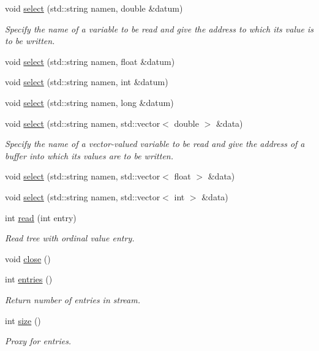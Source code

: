 \begin{CompactItemize}
\item 
void \hyperlink{classitreestream_a11}{select} (std::string namen, double \&datum)
\begin{CompactList}\small\item\em Specify the name of a variable to be read and give the address to which its value is to be written. \item\end{CompactList}\item 
void \hyperlink{classitreestream_a12}{select} (std::string namen, float \&datum)
\item 
void \hyperlink{classitreestream_a13}{select} (std::string namen, int \&datum)
\item 
void \hyperlink{classitreestream_a14}{select} (std::string namen, long \&datum)
\item 
void \hyperlink{classitreestream_a15}{select} (std::string namen, std::vector$<$ double $>$ \&data)
\begin{CompactList}\small\item\em Specify the name of a vector-valued variable to be read and give the address of a buffer into which its values are to be written. \item\end{CompactList}\item 
void \hyperlink{classitreestream_a16}{select} (std::string namen, std::vector$<$ float $>$ \&data)
\item 
void \hyperlink{classitreestream_a17}{select} (std::string namen, std::vector$<$ int $>$ \&data)
\item 
int \hyperlink{classitreestream_a18}{read} (int entry)
\begin{CompactList}\small\item\em Read tree with ordinal value entry. \item\end{CompactList}\item 
void \hyperlink{classitreestream_a19}{close} ()
\item 
int \hyperlink{classitreestream_a20}{entries} ()
\begin{CompactList}\small\item\em Return number of entries in stream. \item\end{CompactList}\item 
int \hyperlink{classitreestream_a21}{size} ()
\begin{CompactList}\small\item\em Proxy for entries. \item\end{CompactList}\item 

\end{CompactItemize}
